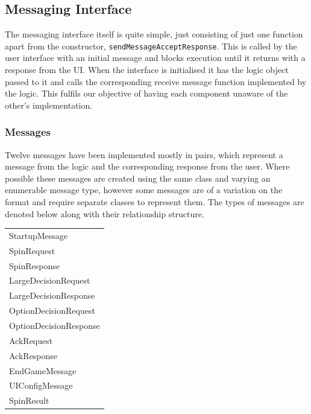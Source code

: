 \documentclass[a4paper, 11pt]{article}
\begin{document}
	\subsection*{Messaging Interface}
	The messaging interface itself is quite simple, just consisting of just one function apart from the constructor, \texttt{sendMessageAcceptResponse}. This is called by the user interface with an initial message and blocks execution until it returns with a response from the UI. When the interface is initialised it has the logic object passed to it and calls the corresponding receive message function implemented by the logic. This fulfils our objective of having each component unaware of the other's implementation. %
	
	\subsubsection*{Messages}
	Twelve messages have been implemented mostly in pairs, which represent a message from the logic and the corresponding response from the user. Where possible these messages are created using the same class and varying an enumerable message type, however some messages are of a variation on the format and require separate classes to represent them. The types of messages are denoted below along with their relationship structure.
	\begin{table}[!ht]
		\begin{flushleft} 
			\begin{tabular}{l} 
				StartupMessage\\
				SpinRequest\\
				SpinResponse\\
				LargeDecisionRequest\\
				LargeDecisionResponse\\
				OptionDecisionRequest\\
				OptionDecisionResponse\\
				AckRequest\\
				AckResponse\\
				EndGameMessage\\
				UIConfigMessage\\
				SpinResult\\	
			\end{tabular}
		\end{flushleft}
	\end{table}
\end{document}
